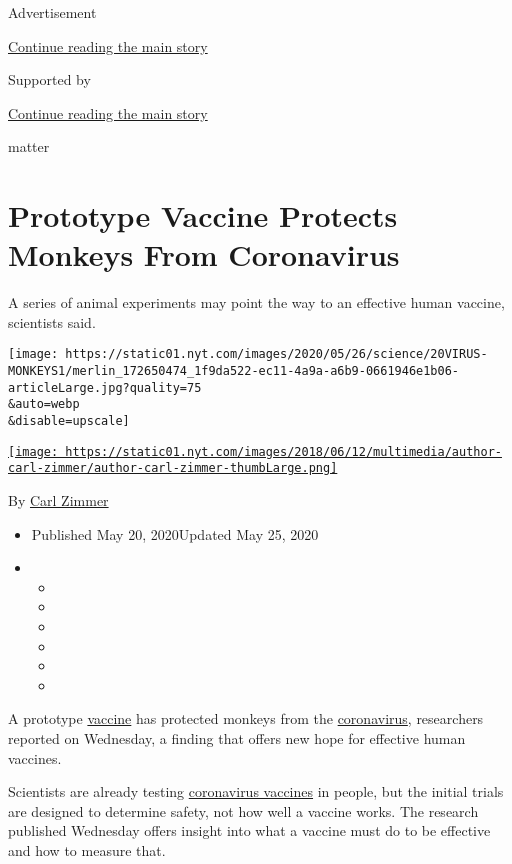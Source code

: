 Advertisement

\protect\hyperlink{after-top}{Continue reading the main story}

Supported by

\protect\hyperlink{after-sponsor}{Continue reading the main story}

matter

\hypertarget{prototype-vaccine-protects-monkeys-from-coronavirus}{%
\section{Prototype Vaccine Protects Monkeys From
Coronavirus}\label{prototype-vaccine-protects-monkeys-from-coronavirus}}

A series of animal experiments may point the way to an effective human
vaccine, scientists said.

\texttt{[image: https://static01.nyt.com/images/2020/05/26/science/20VIRUS-MONKEYS1/merlin\_172650474\_1f9da522-ec11-4a9a-a6b9-0661946e1b06-articleLarge.jpg?quality=75\\\&auto=webp\\\&disable=upscale]}

\href{https://www.nytimes.com/by/carl-zimmer}{\texttt{[image: https://static01.nyt.com/images/2018/06/12/multimedia/author-carl-zimmer/author-carl-zimmer-thumbLarge.png]}}

By \href{https://www.nytimes.com/by/carl-zimmer}{Carl Zimmer}

\begin{itemize}
\item
  Published May 20, 2020Updated May 25, 2020
\item
  \begin{itemize}
  \item
  \item
  \item
  \item
  \item
  \item
  \end{itemize}
\end{itemize}

A prototype
\href{https://www.nytimes.com/2020/05/20/health/coronavirus-vaccines.html}{vaccine}
has protected monkeys from the
\href{https://www.nytimes.com/2020/05/20/health/coronavirus-vaccines.html}{coronavirus},
researchers reported on Wednesday, a finding that offers new hope for
effective human vaccines.

Scientists are already testing
\href{https://www.nytimes.com/2020/06/03/us/politics/coronavirus-vaccine-trump-moderna.html}{coronavirus
vaccines} in people, but the initial trials are designed to determine
safety, not how well a vaccine works. The research published Wednesday
offers insight into what a vaccine must do to be effective and how to
measure that.

